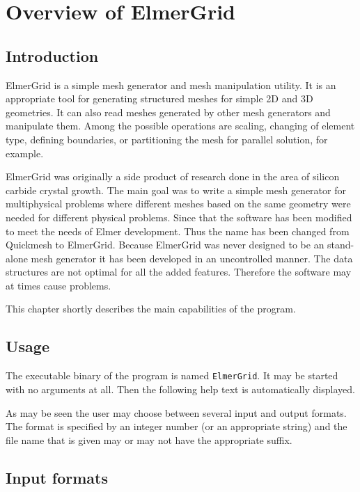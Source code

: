 \chapter{Overview of ElmerGrid}

\section{Introduction}

ElmerGrid is a simple mesh generator and 
mesh manipulation utility. 
It is an appropriate tool for generating structured meshes for 
simple 2D and 3D geometries. 
It can also read meshes generated by other mesh generators and 
manipulate them. Among the possible operations are
scaling, changing of element type, 
defining boundaries, or partitioning the mesh for parallel solution, 
for example.

ElmerGrid was originally a side product of research done in the area
of silicon carbide crystal growth.
The main goal was to write a simple mesh generator for multiphysical
problems where different meshes based on the same geometry were needed for different physical problems.
Since that the software has been modified to meet the 
needs of Elmer development.
Thus the name has been changed from Quickmesh to ElmerGrid.
Because ElmerGrid was never designed to be an stand-alone mesh generator 
it has been developed in an uncontrolled manner. The data structures 
are not optimal for all the added features. Therefore the software may
at times cause problems.

This chapter shortly describes the main 
capabilities of the program.


\section{Usage}
The executable binary of the program is named {\tt ElmerGrid}.
It may be started with no arguments at
all. Then the following help text is automatically 
displayed.



As may be seen the user may choose between several 
input and output formats. The format is specified 
by an integer number (or an appropriate string) and the file name that is given may 
or may not have the appropriate suffix.


\section{Input formats}

